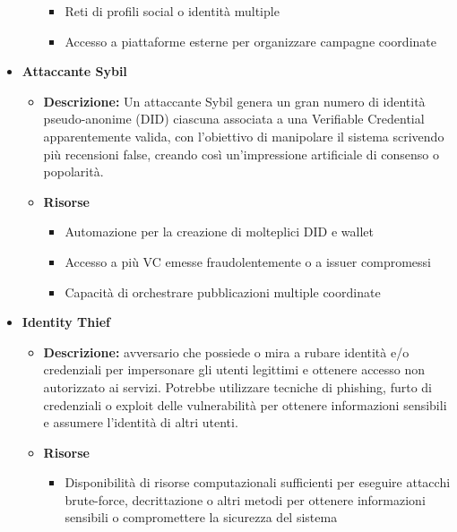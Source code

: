 \begin{itemize}
\begin{itemize}
\begin{itemize}
                            \item Reti di profili social o identità multiple
        
                            \item Accesso a piattaforme esterne per organizzare campagne coordinate
                        \end{itemize}
                \end{itemize}
    
            \item \textbf{Attaccante Sybil}
                \begin{itemize}                    
                    \item \textbf{Descrizione:} Un attaccante Sybil genera un gran numero di identità pseudo-anonime (DID) ciascuna associata a una Verifiable Credential apparentemente valida, con l'obiettivo di manipolare il sistema scrivendo più recensioni false, creando così un'impressione artificiale di consenso o popolarità.
                    
                    \item \textbf{Risorse}
                        \begin{itemize}
                            \item Automazione per la creazione di molteplici DID e wallet
        
                            \item Accesso a più VC emesse fraudolentemente o a issuer compromessi

                            \item Capacità di orchestrare pubblicazioni multiple coordinate
                        \end{itemize}
                \end{itemize}
    
            \item \textbf{Identity Thief}
                \begin{itemize}    
                    \item \textbf{Descrizione:} avversario che possiede o mira a rubare identità e/o credenziali per impersonare gli utenti legittimi e ottenere accesso non autorizzato ai servizi.
                    Potrebbe utilizzare tecniche di phishing, furto di credenziali o exploit delle vulnerabilità per ottenere informazioni sensibili e assumere l'identità di altri utenti.
    
                    \item \textbf{Risorse}
                        \begin{itemize}
                            \item Disponibilità di risorse computazionali sufficienti per eseguire attacchi brute-force, decrittazione o altri metodi per ottenere informazioni sensibili o compromettere la sicurezza del sistema


\end{itemize}
\end{itemize}
\end{itemize}
